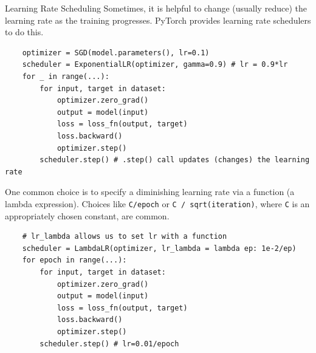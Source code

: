 \begin{frame}[allowframebreaks]

\begin{myconceptblock}{6.27}{Learning Rate Scheduling}
    Sometimes, it is helpful to change (usually reduce) the learning rate as the training progresses. PyTorch provides learning rate schedulers to do this.

    \begin{verbatim}
    optimizer = SGD(model.parameters(), lr=0.1)
    scheduler = ExponentialLR(optimizer, gamma=0.9) # lr = 0.9*lr
    for _ in range(...):
        for input, target in dataset:
            optimizer.zero_grad()
            output = model(input)
            loss = loss_fn(output, target)
            loss.backward()
            optimizer.step()
        scheduler.step() # .step() call updates (changes) the learning rate
    \end{verbatim}

    \par\noindent\textcolor{gray}{\hdashrule{\textwidth}{0.4pt}{1pt 2pt}}

    One common choice is to specify a diminishing learning rate via a function (a lambda expression). Choices like \verb|C/epoch| or \verb|C / sqrt(iteration)|, where \verb|C| is an appropriately chosen constant, are common.

    \begin{verbatim}
    # lr_lambda allows us to set lr with a function
    scheduler = LambdaLR(optimizer, lr_lambda = lambda ep: 1e-2/ep)
    for epoch in range(...):
        for input, target in dataset:
            optimizer.zero_grad()
            output = model(input)
            loss = loss_fn(output, target)
            loss.backward()
            optimizer.step()
        scheduler.step() # lr=0.01/epoch
    \end{verbatim}
\end{myconceptblock}

\end{frame}

